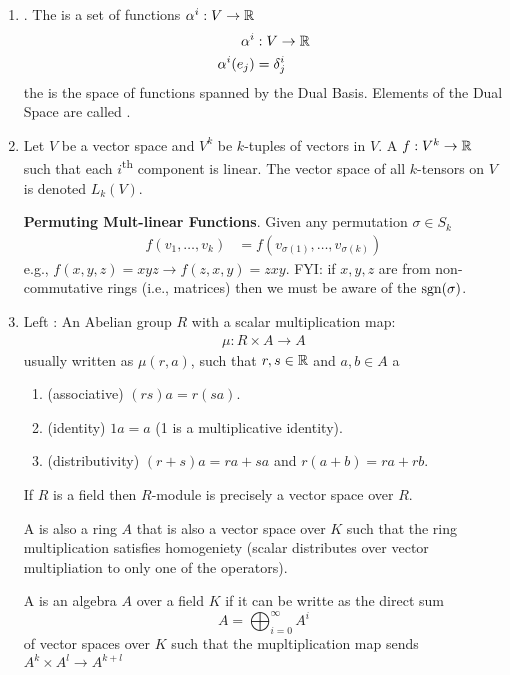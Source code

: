 \documentclass[10pt,a4paper]{report}
\begin{document}
\begin{enumerate}
\begin{itemize}
	\end{itemize}
	\item {}.  The  is a set of functions $\alpha^i: V \to \mathbb{R}$ 
	\begin{align*}
		\alpha^i &: V \to \mathbb{R} \\
			\alpha^i(e_j) &= \delta_j^i
	\end{align*}the  is the space of functions spanned by the Dual Basis. Elements of the Dual Space are called .  
	\item {} Let $V$ be a vector space and $V^k$ be $k$-tuples of vectors in $V$. A  $f: V^k \to \mathbb{R}$ such that each $i$\textsuperscript{th} component is linear.  The vector space of all $k$-tensors on $V$ is denoted $L_k(V)$.
	
	\textbf{Permuting Mult-linear Functions}.  Given any permutation $\sigma \in S_k$
	\begin{align*}
		f(v_1, \dots, v_k) &= f(v_{\sigma(1)}, \dots, v_{\sigma(k)})
	\end{align*}e.g., $f(x,y,z) = xyz \to f(z,x,y) = zxy$.  FYI: if $x,y,z$ are from non-commutative rings (i.e., matrices) then we must be aware of the $\operatorname{sgn}(\sigma)$.
	
	\item Left : An Abelian group $R$ with a scalar multiplication map:
	\begin{align*}
		\mu : R \times A \to A
	\end{align*}usually written as $\mu(r,a)$, such that $r,s \in \mathbb{R}$ and $a,b \in A$	 a
	\begin{enumerate}[label=(\roman*)]
		\item (associative) $(rs)a = r(sa)$.
		\item (identity) $1a = a$ (1 is a multiplicative identity).
		\item (distributivity) $(r+s)a = ra+sa$ and $r(a+b) = ra+rb$.	
	\end{enumerate}	 If $R$ is a field then $R$-module is precisely a vector space over $R$.
	
	A  is also a ring $A$ that is also a vector space over $K$ such that the ring multiplication satisfies homogeniety (scalar distributes over vector multipliation to only one of the operators).
	
	A  is an algebra $A$ over a field $K$ if it can be writte as the direct sum $$ A = \bigoplus_{i=0}^\infty A^i$$ of vector spaces over $K$ such that the mupltiplication map sends $A^k \times A^l \to A^{k+l}$
	

\end{enumerate}
\end{document}
